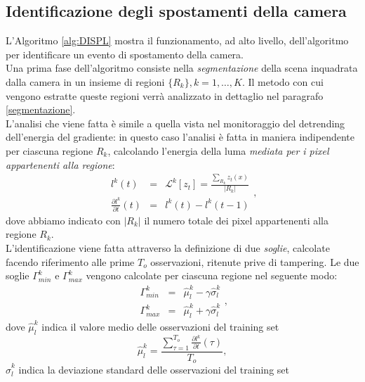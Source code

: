 \subsection{Identificazione degli spostamenti della camera}
\label{monitoraggioDISPL}
L'Algoritmo \ref{alg:DISPL} mostra il funzionamento, ad alto livello, dell'algoritmo per identificare un evento di spostamento della camera.\\
Una prima fase dell'algoritmo consiste nella \textit{segmentazione} della scena inquadrata dalla camera in un insieme di regioni $\{R_k\}, k=1,\dots,K$.
Il metodo con cui vengono estratte queste regioni verr\`a analizzato in dettaglio nel paragrafo \ref{segmentazione}. \\
L'analisi che viene fatta \`e simile a quella vista nel monitoraggio del detrending dell'energia del gradiente:
in questo caso l'analisi \`e fatta in maniera indipendente per ciascuna regione $R_k$, calcolando l'energia della luma \textit{mediata per i pixel appartenenti alla regione}:
\begin{equation}
	\label{eq:lumaRegions}
	\begin{array}{ccc}
	l^k(t)&  = & \mathcal{L}^k[z_t] = \frac{\sum_{R_k} z_t(x) }{|{R_k}|}\\
	\frac{\partial l^k}{\partial t}(t) & =& l^k(t)-l^k(t-1) 
	\end{array},
\end{equation}
dove abbiamo indicato con $|{R_k}|$ il numero totale dei pixel appartenenti alla regione $R_k$.\\
L'identificazione viene fatta attraverso la definizione di due \textit{soglie}, calcolate facendo riferimento alle prime $T_{o}$ osservazioni, ritenute prive di tampering.
Le due soglie $\Gamma_{min}^k$ e $\Gamma_{max}^k$ vengono calcolate per ciascuna regione nel seguente modo:
\begin{equation}
\label{eq:soglieLuma}
\begin{array}{rcl}
\Gamma_{min}^k & = & \hat{\mu}_l^k -\gamma \hat{\sigma}_l^k\\
\Gamma_{max}^k & = & \hat{\mu}_l^k + \gamma \hat{\sigma}_l^k
\end{array},
\end{equation}
dove $\hat{\mu}_l^k$ indica il valore medio delle osservazioni del training set
\begin{equation}
\hat{\mu}_l^k = \frac{\sum_{\tau = 1}^{T_{o}} \frac{\partial l^k}{\partial t}(\tau)}{T_{o}}, \nonumber
\end{equation}
$\hat{\sigma}_l^k$ indica la deviazione standard delle osservazioni del training set
